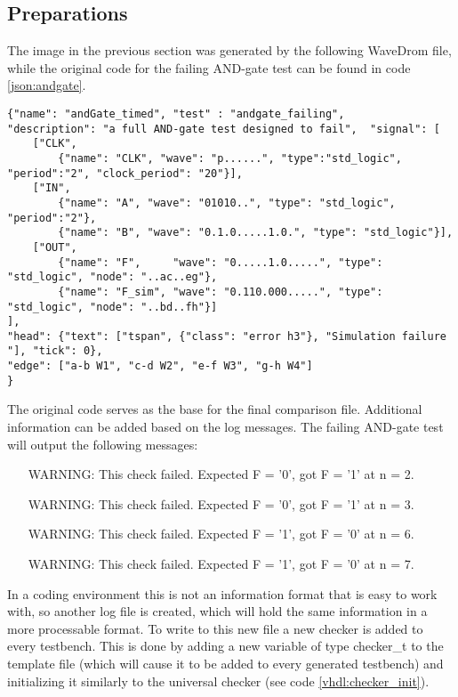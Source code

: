 \subsection{Preparations}
The image in the previous section was generated by the following WaveDrom file, while the original code for the failing AND-gate test can be found in code \ref{json:andgate}.
\begin{lstlisting}[style=json, caption={Source file for the proposed layout in fig \ref{fig:andgate_failing_result}}, label={json:andgate_failing_example}]
{"name": "andGate_timed", "test" : "andgate_failing", 
"description": "a full AND-gate test designed to fail",  "signal": [
	["CLK",
		{"name": "CLK", "wave": "p......", "type":"std_logic", "period":"2", "clock_period": "20"}],
	["IN",
		{"name": "A", "wave": "01010..", "type": "std_logic", "period":"2"},
		{"name": "B", "wave": "0.1.0.....1.0.", "type": "std_logic"}],
	["OUT",
		{"name": "F",     "wave": "0.....1.0.....", "type": "std_logic", "node": "..ac..eg"},
		{"name": "F_sim", "wave": "0.110.000.....", "type": "std_logic", "node": "..bd..fh"}]
], 
"head": {"text": ["tspan", {"class": "error h3"}, "Simulation failure "], "tick": 0}, 
"edge": ["a-b W1", "c-d W2", "e-f W3", "g-h W4"]
}
\end{lstlisting}\nline
The original code serves as the base for the final comparison file. Additional information can be added based on the log messages.
\npar
The failing AND-gate test will output the following messages:
\begin{customenv}\label{somelabel}
	\begin{itemize}
		\item [WARNING:] This check failed. Expected F = '0', got F = '1' at n = 2.
		\item [WARNING:] This check failed. Expected F = '0', got F = '1' at n = 3.
		\item [WARNING:] This check failed. Expected F = '1', got F = '0' at n = 6.
		\item [WARNING:] This check failed. Expected F = '1', got F = '0' at n = 7.
	\end{itemize}
\end{customenv}\nline
In a coding environment this is not an information format that is easy to work with, so another log file is created, which will hold the same information in a more processable format. To write to this new file a new checker is added to every testbench. This is done by adding a new variable of type checker\_t to the template file (which will cause it to be added to every generated testbench) and initializing it similarly to the universal checker (see code \ref{vhdl:checker_init}).

